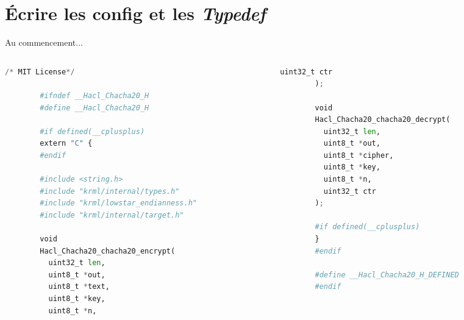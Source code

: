 \documentclass[A4,svgnames,9pt,aspectratio=169]{beamer}
\begin{document}

\section{Écrire les config et les \textit{Typedef}}
\frame{\sectionpage}

\begin{frame}[fragile]{Au commencement...}

  \begin{columns}
    \begin{column}{0.5\textwidth}
      \begin{lstlisting}[style=CStyle, language=Python, gobble=8]
        /* MIT License*/
    
        #ifndef __Hacl_Chacha20_H
        #define __Hacl_Chacha20_H
    
        #if defined(__cplusplus)
        extern "C" {
        #endif
    
        #include <string.h>
        #include "krml/internal/types.h"
        #include "krml/lowstar_endianness.h"
        #include "krml/internal/target.h"
    
        void
        Hacl_Chacha20_chacha20_encrypt(
          uint32_t len,
          uint8_t *out,
          uint8_t *text,
          uint8_t *key,
          uint8_t *n,
        \end{lstlisting}
        
      \end{column}
      
      \begin{column}{0.5\textwidth}
        \begin{lstlisting}[style=CStyle, language=Python, caption={Hacl\_AEAD\_Chacha20Poly1305.h}, gobble=8]   
          uint32_t ctr
        );

        void
        Hacl_Chacha20_chacha20_decrypt(
          uint32_t len,
          uint8_t *out,
          uint8_t *cipher,
          uint8_t *key,
          uint8_t *n,
          uint32_t ctr
        );
    
        #if defined(__cplusplus)
        }
        #endif
    
        #define __Hacl_Chacha20_H_DEFINED
        #endif
      \end{lstlisting}
      
    \end{column}
  \end{columns}




\end{frame}
\end{document}
